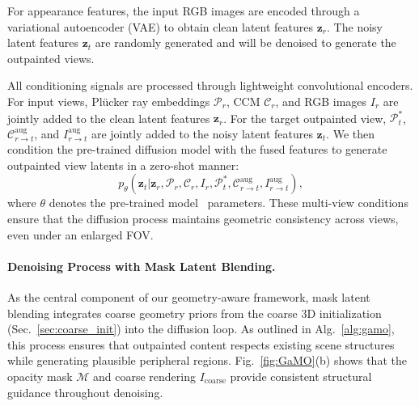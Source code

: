 \documentclass[runningheads]{llncs}
\begin{document}
For appearance features, the input RGB images are encoded through a variational autoencoder (VAE) to obtain clean latent features $\mathbf{z}_r$. The noisy latent features $\mathbf{z}_t$ are randomly generated and will be denoised to generate the outpainted views. 

All conditioning signals are processed through lightweight convolutional encoders. 
For input views, Plücker ray embeddings $\mathcal{P}_r$, CCM $\mathcal{C}_r$, 
and RGB images $I_r$ are jointly added to the clean latent features $\mathbf{z}_r$. 
For the target outpainted view, $\mathcal{P}_t^*$, $\mathcal{C}_{r \rightarrow t}^{\text{aug}}$, 
and $I_{r \rightarrow t}^{\text{aug}}$ are jointly added to the noisy latent 
features $\mathbf{z}_t$. We then condition the pre-trained diffusion model with 
the fused features to generate outpainted view latents in a zero-shot manner:
\begin{equation}
p_\theta(\mathbf{z}_t | \mathbf{z}_r, \mathcal{P}_r, \mathcal{C}_r, I_r, \mathcal{P}_t^*, \mathcal{C}_{r \rightarrow t}^{\text{aug}}, I_{r \rightarrow t}^{\text{aug}}),
\label{eq:diffusion_conditioning}
\end{equation}
where $\theta$ denotes the pre-trained model~\cite{cao2025mvgenmaster} parameters. These multi-view conditions ensure that the diffusion process maintains geometric consistency across views, even under an enlarged FOV.

\paragraph{Denoising Process with Mask Latent Blending.}
As the central component of our geometry-aware framework, mask latent blending integrates coarse geometry priors from the coarse 3D initialization (Sec.~\ref{sec:coarse_init}) into the diffusion loop. As outlined in Alg.~\ref{alg:gamo}, this process ensures that outpainted content respects existing scene structures while generating plausible peripheral regions. Fig.~\ref{fig:GaMO}(b) shows that the opacity mask $\mathcal{M}$ and coarse rendering $I_{\text{coarse}}$ provide consistent structural guidance throughout denoising.
\end{document}
